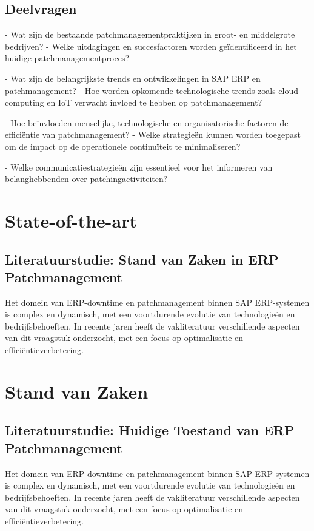 \subsection{Deelvragen}
- Wat zijn de bestaande patchmanagementpraktijken in groot- en middelgrote bedrijven?
- Welke uitdagingen en succesfactoren worden geïdentificeerd in het huidige patchmanagementproces?

- Wat zijn de belangrijkste trends en ontwikkelingen in SAP ERP en patchmanagement?
- Hoe worden opkomende technologische trends zoals cloud computing en IoT verwacht invloed te hebben op patchmanagement?

- Hoe beïnvloeden menselijke, technologische en organisatorische factoren de efficiëntie van patchmanagement?
- Welke strategieën kunnen worden toegepast om de impact op de operationele continuïteit te minimaliseren?

- Welke communicatiestrategieën zijn essentieel voor het informeren van belanghebbenden over patchingactiviteiten?



\section{State-of-the-art}%
\label{sec:state-of-the-art}

\subsection{Literatuurstudie: Stand van Zaken in ERP Patchmanagement}

Het domein van ERP-downtime en patchmanagement binnen SAP ERP-systemen is complex en dynamisch, met een voortdurende evolutie van technologieën en bedrijfsbehoeften. In recente jaren heeft de vakliteratuur verschillende aspecten van dit vraagstuk onderzocht, met een focus op optimalisatie en efficiëntieverbetering.

\section{Stand van Zaken}%
\label{sec:stand-van-zaken}

\subsection{Literatuurstudie: Huidige Toestand van ERP Patchmanagement}

Het domein van ERP-downtime en patchmanagement binnen SAP ERP-systemen is complex en dynamisch, met een voortdurende evolutie van technologieën en bedrijfsbehoeften. In recente jaren heeft de vakliteratuur verschillende aspecten van dit vraagstuk onderzocht, met een focus op optimalisatie en efficiëntieverbetering.

